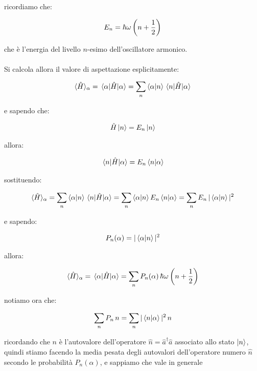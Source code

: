 	ricordiamo che:

\begin{align*}
	E_n = \hbar \omega \, \qty(n + \frac{1}{2})
\end{align*}

	che è  l’energia del livello $n$-esimo dell’oscillatore armonico.
	\\
	\\
	Si calcola allora il valore di aspettazione esplicitamente:
	
\begin{align*}
	\langle \hat{H} \rangle_{\alpha} = \mel{\alpha}{\hat{H}}{\alpha} = \sum_n \braket{\alpha}{n} \mel{n}{\hat{H}}{\alpha}
\end{align*}
	
	e sapendo che:
	
\begin{align*}
	\hat{H} \ket{n} = E_n \ket{n}
\end{align*}

	allora:
	
\begin{align*}
	\mel{n}{\hat{H}}{\alpha} = E_n \braket{n}{\alpha}
\end{align*}

	sostituendo:
	
\begin{align*}
	\langle \hat{H} \rangle_{\alpha} = \sum_n \braket{\alpha}{n} \mel{n}{\hat{H}}{\alpha} = \sum_n \braket{\alpha}{n} E_n \braket{n}{\alpha} = \sum_n E_n \, |\braket{\alpha}{n}|^2
\end{align*}
	
	e sapendo:
	
\begin{align*}
	P_n(\alpha) = |\braket{\alpha}{n}|^2
\end{align*}
	
	allora:

\begin{align*}
	\langle \hat{H} \rangle_{\alpha} = \mel{\alpha}{\hat{H}}{\alpha} = \sum_n P_n(\alpha) \, \hbar \omega \, \qty( n + \frac{1}{2})
\end{align*}

	notiamo ora che:
	
\begin{align*}
	\sum_n P_n \, n = \sum_n |\braket{n}{\alpha}|^2 \, n
\end{align*}

	ricordando che $n$ è l’autovalore dell’operatore $\hat{n} = \hat{a}^{\dagger}\hat{a} $ associato allo stato $\ket{n}$, quindi stiamo facendo la media pesata degli autovalori dell’operatore numero $\hat{n}$ secondo le probabilità $P_n(\alpha)$, e sappiamo che vale in generale
	
